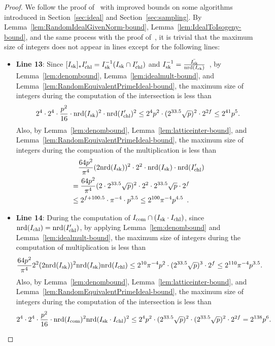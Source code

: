 \begin{proof}
We follow the proof of~\cite[Theorem~2]{KLKL25} with improved bounds on some algorithms introduced in Section~\ref{sec:ideal} and Section~\ref{sec:sampling}.
By Lemma~\ref{lem:RandomIdealGivenNorm-bound}, Lemma~\ref{lem:IdealToIsogeny-bound}, and the same process with the proof of~\cite[Theorem~2]{KLKL25}, it is trivial that the maximum size of integers does not appear in lines except for the following lines:
\begin{itemize}
    \item\textbf{Line 13}: Since $[I_\text{sk}]_*I_\text{chl}' = I_\text{sk}^{-1}(I_\text{sk}\cap I_\text{chl}')$ and $I_\text{sk}^{-1} = \frac{\bar{I_\text{sk}}}{\mathrm{nrd}(I_\text{sk})}$~\cite[16.6.14]{Voi21},
    by Lemma~\ref{lem:denombound}, Lemma~\ref{lem:idealmult-bound}, and Lemma~\ref{lem:RandomEquivalentPrimeIdeal-bound}, the maximum size of integers during the computation of the intersection is less than
    \[
        2^4\cdot2^4\cdot\frac{p^2}{16}\cdot\mathrm{nrd}(I_\text{sk})^2\cdot\mathrm{nrd}(I_\text{chl}')^2
        \le 2^4p^2 \cdot (2^{33.5}\sqrt{p})^2\cdot 2^{2f}
        \le 2^{41}p^5.
    \]
    Also, by Lemma~\ref{lem:denombound}, Lemma~\ref{lem:latticeinter-bound}, and Lemma~\ref{lem:RandomEquivalentPrimeIdeal-bound}, the maximum size of integers during the compuation of the multiplication is less than
    \[\begin{aligned}
        &\quad\frac{64p^2}{\pi^4}(2\mathrm{nrd}(I_\text{sk}))^2\cdot2^2\cdot\mathrm{nrd}(I_\text{sk})\cdot\mathrm{nrd}(I_\text{chl}')\\
        &= \frac{64p^2}{\pi^4}(2\cdot2^{33.5}\sqrt{p} )^2 \cdot 2^2 \cdot 2^{33.5}\sqrt{p} \cdot 2^f\\
        &\le 2^{f+100.5} \cdot \pi^{-4} \cdot p^{3.5}
        \le 2^{100}\pi^{-4}p^{4.5}\enspace.
    \end{aligned}\]

    \item\textbf{Line 14}: During the computation of $I_\text{com} \cap (I_\text{sk} \cdot I_\text{chl})$, since $\mathrm{nrd}(I_\text{chl})=\mathrm{nrd}(I_\text{chl}')$, by applying Lemma~\ref{lem:denombound} and Lemma~\ref{lem:idealmult-bound}, the maximum size of integers during the computation of multiplication is less than
    \[
        \frac{64p^2}{\pi^4}2^2(2\mathrm{nrd}(I_\text{sk}))^2\mathrm{nrd}(I_\text{sk})\mathrm{nrd}(I_\text{chl}) \le 2^{10}\pi^{-4}p^2 \cdot (2^{33.5}\sqrt{p})^3 \cdot 2^f \le 2^{110}\pi^{-4}p^{3.5}.
    \]
    Also, by Lemma~\ref{lem:denombound}, Lemma~\ref{lem:latticeinter-bound}, and Lemma~\ref{lem:RandomEquivalentPrimeIdeal-bound}, the maximum size of integers during the computation of the intersection is less than
    \[
        2^4\cdot2^4\cdot\frac{p^2}{16}\cdot\mathrm{nrd}(I_\text{com})^2\mathrm{nrd}(I_\text{sk} \cdot I_\text{chl})^2
        \le 2^4p^2 \cdot (2^{33.5}\sqrt{p})^2 \cdot (2^{33.5}\sqrt{p})^2 \cdot 2^{2f}
        = 2^{138}p^6.
    \]


\end{itemize}
\end{proof}
